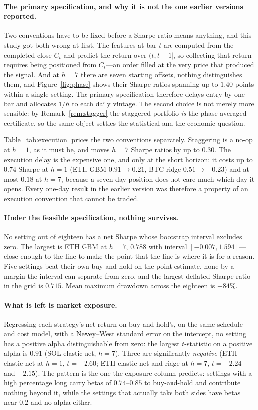 \documentclass{article}
\theoremstyle{plain}
\theoremstyle{definition}
\begin{document}
\paragraph{The primary specification, and why it is not the one earlier versions reported.}
Two conventions have to be fixed before a Sharpe ratio means anything, and this study got
both wrong at first. The features at bar $t$ are computed from the completed close $C_t$ and
predict the return over $(t,t+1]$, so collecting that return requires being positioned from
$C_t$---an order filled at the very price that produced the signal. And at $h=7$ there are
seven starting offsets, nothing distinguishes them, and Figure~\ref{fig:phase} shows their
Sharpe ratios spanning up to $1.40$ points within a single setting. The primary specification
therefore delays entry by one bar and allocates $1/h$ to each daily vintage. The second
choice is not merely more sensible: by Remark~\ref{rem:stagger} the staggered portfolio
\emph{is} the phase-averaged certificate, so the same object settles the statistical and the
economic question.

Table~\ref{tab:execution} prices the two conventions separately. Staggering is a no-op at
$h=1$, as it must be, and moves $h=7$ Sharpe ratios by up to $0.30$. The execution delay is
the expensive one, and only at the short horizon: it costs up to $0.74$ Sharpe at $h=1$
(ETH GBM $0.91\to0.21$, BTC ridge $0.51\to-0.23$) and at most $0.18$ at $h=7$, because a
seven-day position does not care much which day it opens. Every one-day result in the earlier
version was therefore a property of an execution convention that cannot be traded.

\paragraph{Under the feasible specification, nothing survives.} No setting out of eighteen
has a net Sharpe whose bootstrap interval excludes zero. The largest is ETH GBM at $h=7$,
$0.788$ with interval $[-0.007, 1.594]$---close enough to the line to make the point that the
line is where it is for a reason. Five settings beat their own buy-and-hold on the point
estimate, none by a margin the interval can separate from zero, and the largest deflated
Sharpe ratio in the grid is $0.715$. Mean maximum drawdown across the eighteen is $-84\%$.

\paragraph{What is left is market exposure.} Regressing each strategy's net return on
buy-and-hold's, on the same schedule and cost model, with a Newey--West standard error on the
intercept, no setting has a positive alpha distinguishable from zero: the largest $t$-statistic
on a positive alpha is $0.91$ (SOL elastic net, $h=7$). Three are significantly \emph{negative}
(ETH elastic net at $h=1$, $t=-2.60$; ETH elastic net and ridge at $h=7$, $t=-2.24$ and
$-2.15$). The pattern is the one the exposure column predicts: settings with a high percentage
long carry betas of $0.74$--$0.85$ to buy-and-hold and contribute nothing beyond it, while the
settings that actually take both sides have betas near $0.2$ and no alpha either.
\end{document}

